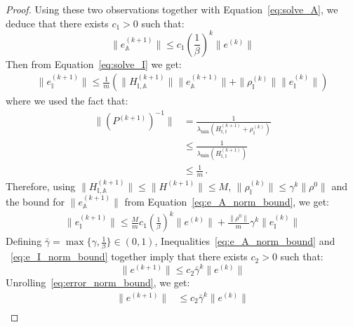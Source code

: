 \documentclass[10pt,a4paper]{amsart}
\begin{document}
\begin{proof}
Using these two observations together with Equation~\eqref{eq:solve_A}, we deduce that there exists $c_1 > 0$ such that:
\begin{equation}
\label{eq:e_A_norm_bound}
\|e_{\mathbb{A}}^{(k+1)}\| \leq c_1 \left(\frac{1}{\beta}\right)^{k} \|e^{(k)}\|
\end{equation}
Then from Equation~\eqref{eq:solve_I} we get:
\begin{equation}
\begin{aligned}
        \|e_{\mathbb{I}}^{(k+1)}\| \leq \frac{1}{m} \left( \|H_{\mathbb{I},\mathbb{A}}^{(k+1)}\| \|e_{\mathbb{A}}^{(k+1)}\|
        +  \|\rho_{\mathbb{I}}^{(k)}\|\|e_{\mathbb{I}}^{(k)}\|\right)
\end{aligned}
\end{equation}
where we used the fact that:
\begin{equation}
\begin{aligned}
    \|\left( P^{(k+1)} \right)^{-1}\| &= \frac{1}{\lambda_{\min}\left(H_{\mathbb{I}, \mathbb{I}}^{(k+1)} + \rho_{\mathbb{I}}^{(k)}\right)}\\
    &\leq \frac{1}{\lambda_{\min}\left( H_{\mathbb{I}, \mathbb{I}}^{(k+1)} \right)} \\
    &\leq \frac{1}{m} \,.
\end{aligned}
\end{equation}
Therefore, using $\|H^{(k+1)}_{\mathbb{I}, \mathbb{A}} \| \leq \|H^{(k+1)}\| \leq M$, $\|\rho_{\mathbb{I}}^{(k)}\| \leq \gamma^k \|\rho^0\|$ and the bound for $\|e_{\mathbb{A}}^{(k+1)}\|$ from Equation~\eqref{eq:e_A_norm_bound}, we get:
\begin{equation}
\label{eq:e_I_norm_bound}
\begin{aligned}
    \|e_{\mathbb{I}}^{(k+1)}\| \leq \frac{M}{m} c_1 \left(\frac{1}{\beta}\right)^k \|e^{(k)}\| + \frac{\|\rho^0\|}{m} \gamma^k \|e_{\mathbb{I}}^{(k)}\|
\end{aligned}
\end{equation}
Defining $\bar{\gamma} = \max\{\gamma, \frac{1}{\beta}\} \in (0,1)$, Inequalities~\eqref{eq:e_A_norm_bound} and ~\eqref{eq:e_I_norm_bound} together imply that there exists $c_2>0$ such that:
\begin{equation}
    \label{eq:error_norm_bound}
    \|e^{(k+1)}\| \leq c_2 \bar{\gamma}^k \|e^{(k)}\|
\end{equation}
Unrolling~\eqref{eq:error_norm_bound}, we get:
\begin{equation}
    \begin{aligned}
        \|e^{(k+1)}\| &\leq c_2 \bar{\gamma}^k \|e^{(k)}\| \\

\end{aligned}
\end{equation}
\end{proof}
\end{document}
